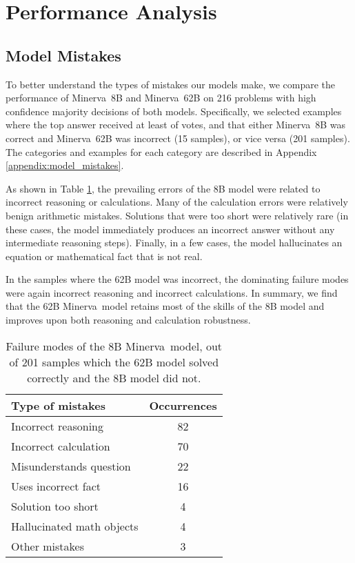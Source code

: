 \documentclass{article}
\newcommand{\ourmodel}[0]{{Minerva~}}
\begin{document}
\section{Performance Analysis}

\subsection{Model Mistakes}
\label{sec:mistake_exploration}

To better understand the types of mistakes our models make, we compare the performance of \ourmodel 8B and \ourmodel 62B on 216 problems with high confidence majority decisions of both models. Specifically, we selected examples where the top answer received at least  of votes, and that either \ourmodel 8B was correct and \ourmodel 62B was incorrect (15 samples), or vice versa (201 samples). The categories and examples for each category are described in Appendix \ref{appendix:model_mistakes}.

As shown in Table \ref{table:mistakes_8b}, the prevailing errors of the 8B model were related to incorrect reasoning or calculations. Many of the calculation errors were relatively benign arithmetic mistakes.
Solutions that were too short were relatively rare (in these cases, the model immediately produces an incorrect answer without any intermediate reasoning steps).
Finally, in a few cases, the model hallucinates an equation or mathematical fact that is not real.

In the samples where the 62B model was incorrect, the dominating failure modes were again incorrect reasoning and incorrect calculations.
In summary, we find that the 62B \ourmodel model retains most of the skills of the 8B model and improves upon both reasoning and calculation robustness. 

\begin{table}[ht!]  
\caption{\small Failure modes of the 8B \ourmodel model, out of 201 samples which the 62B model solved correctly and the 8B model did not.}
\label{table:mistakes_8b}
\begin{center}
\begin{tabular}{lc}
\toprule
Type of mistakes & Occurrences \\
\midrule
Incorrect reasoning & 82 \\
Incorrect calculation & 70 \\
Misunderstands question & 22 \\
Uses incorrect fact & 16 \\
Solution too short & 4 \\
Hallucinated math objects & 4 \\
Other mistakes & 3 \\
\bottomrule
\end{tabular}
\end{center}
\end{table}
\end{document}
